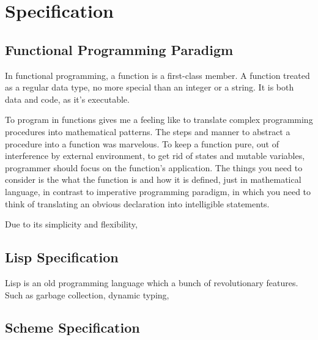 
\section{Specification}
\subsection{Functional Programming Paradigm}
In functional programming, a function is a first-class
member. A function treated as a regular data type, no more special
than an integer or a string. It is both data and code, as it's
executable.

To program in functions gives me a feeling like to translate complex
programming procedures into mathematical patterns. The steps and
manner to abstract a procedure into a function was marvelous.
To keep a function pure, out of interference by external
environment, to get rid of states and mutable variables, programmer
should focus on the function's application. The things you need to
consider is the what the function is and how it is defined, just in
mathematical language, in contrast to imperative programming paradigm,
in which you need to think of translating an obvious declaration into
intelligible statements.

Due to its simplicity and flexibility,

\subsection{Lisp Specification}
Lisp is an old programming language which a bunch of revolutionary
features. Such as garbage collection, dynamic typing,
\subsection{Scheme Specification}



